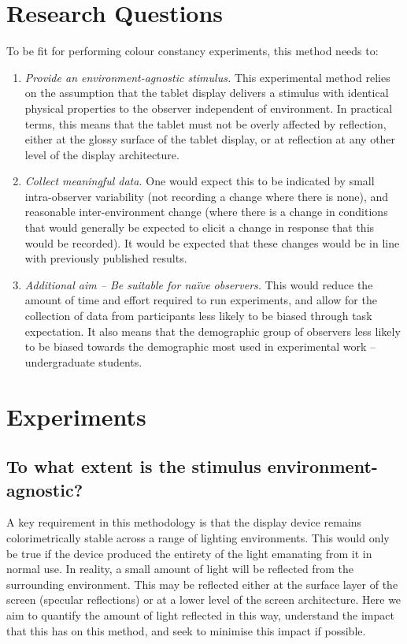 \section{Research Questions}

To be fit for performing colour constancy experiments, this method needs to:

\begin{enumerate}
    \item \emph{Provide an environment-agnostic stimulus.} 
    This experimental method relies on the assumption that the tablet display delivers a stimulus with identical physical properties to the observer independent of environment. In practical terms, this means that the tablet must not be overly affected by reflection, either at the glossy surface of the tablet display, or at reflection at any other level of the display architecture.
    \item \emph{Collect meaningful data.}
    One would expect this to be indicated by small intra-observer variability (not recording a change where there is none), and reasonable inter-environment change (where there is a change in conditions that would generally be expected to elicit a change in response that this would be recorded). It would be expected that these changes would be in line with previously published results.
    \item \emph{Additional aim – Be suitable for naïve observers.}
    This would reduce the amount of time and effort required to run experiments, and allow for the collection of data from participants less likely to be biased through task expectation. It also means that the demographic group of observers less likely to be biased towards the demographic most used in experimental work – undergraduate students.
\end{enumerate}

\section{Experiments}
\subsection{To what extent is the stimulus environment-agnostic?}

A key requirement in this methodology is that the display device remains colorimetrically stable across a range of lighting environments. This would only be true if the device produced the entirety of the light emanating from it in normal use. In reality, a small amount of light will be reflected from the surrounding environment. This may be reflected either at the surface layer of the screen (specular reflections) or at a lower level of the screen architecture. Here we aim to quantify the amount of light reflected in this way, understand the impact that this has on this method, and seek to minimise this impact if possible.

